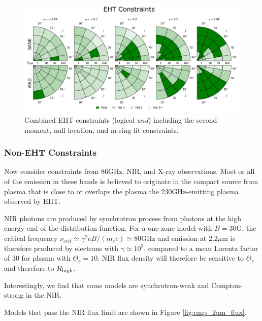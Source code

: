 \begin{figure}
  \centering
    \includegraphics[width=\columnwidth]{./figures/Interferometric_Constraints.png}
  \caption{Combined EHT constraints (logical {\em and}) including the second moment, null location, and m-ring fit constraints.}
  \label{fig:all_EHT_constraints}
\end{figure}

\subsubsection{Non-EHT Constraints}

Now consider constraints from 86GHz, NIR, and X-ray observations.  Most or all of the emission in these bands is believed to originate in the compact source from plasma that is close to or overlaps the plasma the 230GHz-emitting plasma observed by EHT.



NIR photons are produced by synchrotron process from photons at the high energy end of the distribution function.  For a one-zone model with $B = 30$G, the  critical frequency $\nu_{crit} \simeq \gamma^2 e B/(m_e c) \simeq 80$GHz and emission at $2.2\mu$m is therefore produced by electrons with $\gamma \simeq 10^3$, compared to a mean Lorentz factor of $30$ for plasma with $\Theta_e = 10$.  NIR flux density will therefore be sensitive to $\Theta_e$ and therefore to $R_\mathrm{high}$.

Interestingly, we find that some models are synchrotron-weak and Compton-strong in the NIR.  

Models that pass the NIR flux limit are shown in Figure \ref{fig:cmp_2um_flux}.

